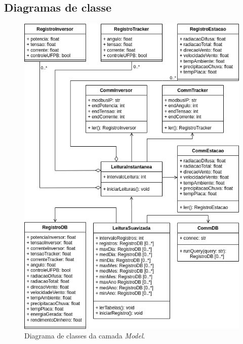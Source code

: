 \documentclass[a4paper,12pt]{article}
\begin{document}
\subsection{Diagramas de classe}

\begin{figure}
    \centering
    \includegraphics[width=\linewidth]{diagrama de classes.drawio.png}
    \caption{Diagrama de classes da camada \textit{Model}.}
    \label{fig:diagrama-classes-model}
\end{figure}
\end{document}
